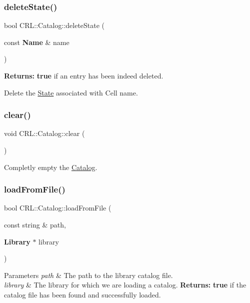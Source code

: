 \subsubsection{\texorpdfstring{delete\+State()}{deleteState()}}
{\footnotesize\ttfamily bool C\+R\+L\+::\+Catalog\+::delete\+State (\begin{DoxyParamCaption}\item[{const \textbf{ Name} \&}]{name }\end{DoxyParamCaption})}

{\bfseries Returns\+:} {\bfseries true} if an entry has been indeed deleted.

Delete the \mbox{\hyperlink{classCRL_1_1Catalog_1_1State}{State}} associated with Cell {\ttfamily name}. \mbox{\label{classCRL_1_1Catalog_aa40bdbaf5b64f56b085bfce72dc89fe6}} 
\subsubsection{\texorpdfstring{clear()}{clear()}}
{\footnotesize\ttfamily void C\+R\+L\+::\+Catalog\+::clear (\begin{DoxyParamCaption}{ }\end{DoxyParamCaption})}

Completly empty the \mbox{\hyperlink{classCRL_1_1Catalog}{Catalog}}. \mbox{\label{classCRL_1_1Catalog_a02ae9d3636235db933a29c08329c5778}} 
\subsubsection{\texorpdfstring{load\+From\+File()}{loadFromFile()}}
{\footnotesize\ttfamily bool C\+R\+L\+::\+Catalog\+::load\+From\+File (\begin{DoxyParamCaption}\item[{const string \&}]{path,  }\item[{\textbf{ Library} $\ast$}]{library }\end{DoxyParamCaption})}


\begin{DoxyParams}{Parameters}
{\em path} & The path to the library catalog file. \\
\hline
{\em library} & The library for which we are loading a catalog. {\bfseries Returns\+:} {\bfseries true} if the catalog file has been found and successfully loaded. \\
\hline
\end{DoxyParams}
\mbox{\label{classCRL_1_1Catalog_a3e326d2515c01af4fc75e421a3b61a81}} 
